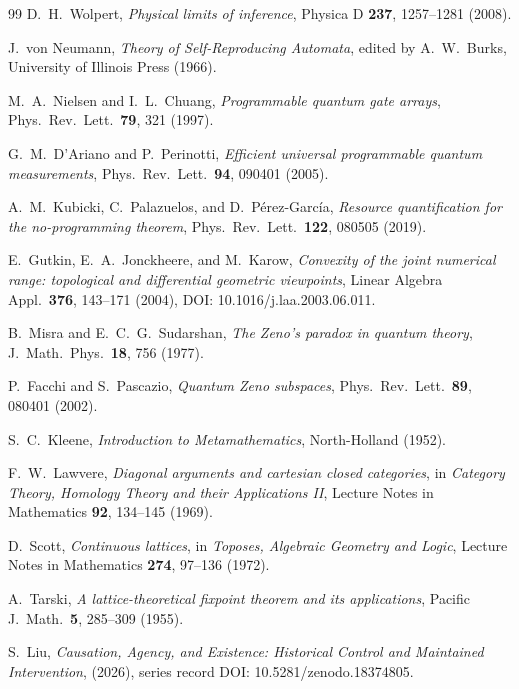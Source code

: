 \documentclass[12pt,a4paper]{article}
\begin{document}
\begin{thebibliography}{99}
D.~H.~Wolpert, \emph{Physical limits of inference}, Physica D \textbf{237}, 1257--1281 (2008).

J.~von Neumann, \emph{Theory of Self-Reproducing Automata}, edited by A.~W.~Burks, University of Illinois Press (1966).

M.~A.~Nielsen and I.~L.~Chuang, \emph{Programmable quantum gate arrays}, Phys.\ Rev.\ Lett.\ \textbf{79}, 321 (1997).

G.~M.~D'Ariano and P.~Perinotti, \emph{Efficient universal programmable quantum measurements}, Phys.\ Rev.\ Lett.\ \textbf{94}, 090401 (2005).

A.~M.~Kubicki, C.~Palazuelos, and D.~P\'erez-Garc\'ia, \emph{Resource quantification for the no-programming theorem}, Phys.\ Rev.\ Lett.\ \textbf{122}, 080505 (2019).

E.~Gutkin, E.~A.~Jonckheere, and M.~Karow, \emph{Convexity of the joint numerical range: topological and differential geometric viewpoints}, Linear Algebra Appl.\ \textbf{376}, 143--171 (2004), DOI: 10.1016/j.laa.2003.06.011.

B.~Misra and E.~C.~G.~Sudarshan, \emph{The Zeno's paradox in quantum theory}, J.\ Math.\ Phys.\ \textbf{18}, 756 (1977).

P.~Facchi and S.~Pascazio, \emph{Quantum Zeno subspaces}, Phys.\ Rev.\ Lett.\ \textbf{89}, 080401 (2002).

S.~C.~Kleene, \emph{Introduction to Metamathematics}, North-Holland (1952).

F.~W.~Lawvere, \emph{Diagonal arguments and cartesian closed categories}, in \emph{Category Theory, Homology Theory and their Applications II}, Lecture Notes in Mathematics \textbf{92}, 134--145 (1969).

D.~Scott, \emph{Continuous lattices}, in \emph{Toposes, Algebraic Geometry and Logic}, Lecture Notes in Mathematics \textbf{274}, 97--136 (1972).

A.~Tarski, \emph{A lattice-theoretical fixpoint theorem and its applications}, Pacific J.\ Math.\ \textbf{5}, 285--309 (1955).


S.~Liu, \emph{Causation, Agency, and Existence: Historical Control and Maintained Intervention}, (2026), series record DOI: 10.5281/zenodo.18374805.


\end{thebibliography}
\end{document}
